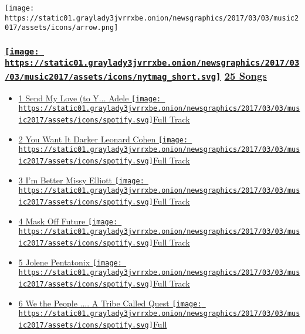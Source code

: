 \texttt{[image: https://static01.graylady3jvrrxbe.onion/newsgraphics/2017/03/03/music2017/assets/icons/arrow.png]}

\hypertarget{-25-songs}{%
\subsubsection[ \protect\hyperlink{ux2f}{25
Songs}]{\texorpdfstring{\href{http://www.nytimes3xbfgragh.onion/magazine}{\protect\texttt{[image: https://static01.graylady3jvrrxbe.onion/newsgraphics/2017/03/03/music2017/assets/icons/nytmag\_short.svg]}}
\protect\hyperlink{ux2f}{25 Songs}}{ 25 Songs}}\label{-25-songs}}

\begin{itemize}
\tightlist
\item
  \protect\hyperlink{ux2fadele-send-my-love-to-your-new-lover}{ 1 Send
  My Love (to Y... Adele }
  \href{https://open.spotify.com/track/3LGxef3inmn5jMLGDz9lqw}{\texttt{[image: https://static01.graylady3jvrrxbe.onion/newsgraphics/2017/03/03/music2017/assets/icons/spotify.svg]}Full
  Track}
\item
  \protect\hyperlink{ux2fleonard-cohen-you-want-it-darker}{ 2 You Want
  It Darker Leonard Cohen }
  \href{https://open.spotify.com/track/5zb7npjQqoJ7Kcpq4yD9qn}{\texttt{[image: https://static01.graylady3jvrrxbe.onion/newsgraphics/2017/03/03/music2017/assets/icons/spotify.svg]}Full
  Track}
\item
  \protect\hyperlink{ux2fmissy-elliott-im-better}{ 3 I'm Better Missy
  Elliott }
  \href{https://open.spotify.com/track/2Kf9fwIOwZwd6Aw7OxfkF0}{\texttt{[image: https://static01.graylady3jvrrxbe.onion/newsgraphics/2017/03/03/music2017/assets/icons/spotify.svg]}Full
  Track}
\item
  \protect\hyperlink{ux2ffuture-mask-off}{ 4 Mask Off Future }
  \href{https://open.spotify.com/track/3rOSwuTsUlJp0Pu0MkN8r8}{\texttt{[image: https://static01.graylady3jvrrxbe.onion/newsgraphics/2017/03/03/music2017/assets/icons/spotify.svg]}Full
  Track}
\item
  \protect\hyperlink{ux2fpentatonix-jolene}{ 5 Jolene Pentatonix }
  \href{https://open.spotify.com/track/60PbWX0IWXg10YaE6VlywH}{\texttt{[image: https://static01.graylady3jvrrxbe.onion/newsgraphics/2017/03/03/music2017/assets/icons/spotify.svg]}Full
  Track}
\item
  \protect\hyperlink{ux2fa-tribe-called-quest-we-the-people-}{ 6 We the
  People .... A Tribe Called Quest }
  \href{https://open.spotify.com/track/3wUX7HpXS382s1DHTRouVk}{\texttt{[image: https://static01.graylady3jvrrxbe.onion/newsgraphics/2017/03/03/music2017/assets/icons/spotify.svg]}Full
}
\end{itemize}
